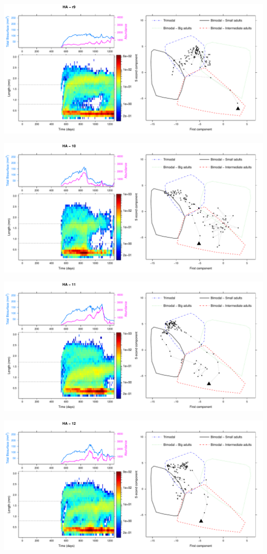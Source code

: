 \includegraphics[height=0.33\textheight]{3-1_ChapExp1/Fig/HA-21-r9}

\includegraphics[height=0.33\textheight]{3-1_ChapExp1/Fig/HA-21-10}

\includegraphics[height=0.33\textheight]{3-1_ChapExp1/Fig/HA-21-11}

\includegraphics[height=0.33\textheight]{3-1_ChapExp1/Fig/HA-21-12}

